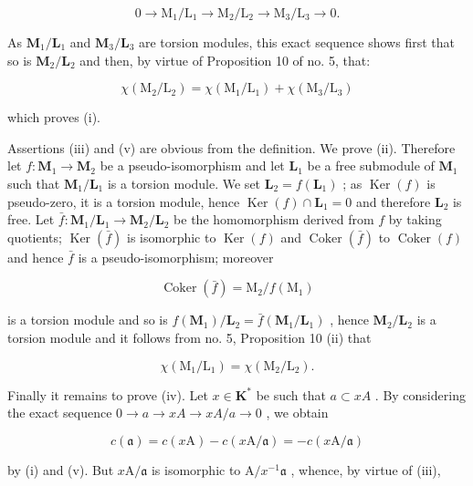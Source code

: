 \[
0 \rightarrow \mathrm{M} _ {1} / \mathrm{L} _ {1} \rightarrow \mathrm{M} _ {2} / \mathrm{L} _ {2} \rightarrow \mathrm{M} _ {3} / \mathrm{L} _ {3} \rightarrow 0.
\]

As \(\mathbf{M}_1 / \mathbf{L}_1\) and \(\mathbf{M}_3 / \mathbf{L}_3\) are torsion modules, this exact sequence shows first that so is \(\mathbf{M}_2 / \mathbf{L}_2\) and then, by virtue of Proposition 10 of no. 5, that:

\[
\chi (\mathrm{M} _ {2} / \mathrm{L} _ {2}) = \chi (\mathrm{M} _ {1} / \mathrm{L} _ {1}) + \chi (\mathrm{M} _ {3} / \mathrm{L} _ {3})
\]

which proves (i).

Assertions (iii) and (v) are obvious from the definition. We prove (ii). Therefore let \(f \colon \mathbf{M}_1 \to \mathbf{M}_2\) be a pseudo-isomorphism and let \(\mathbf{L}_1\) be a free submodule of \(\mathbf{M}_1\) such that \(\mathbf{M}_1 / \mathbf{L}_1\) is a torsion module. We set \(\mathbf{L}_2 = f(\mathbf{L}_1)\) ; as \(\operatorname{Ker}(f)\) is pseudo-zero, it is a torsion module, hence \(\operatorname{Ker}(f) \cap \mathbf{L}_1 = 0\) and therefore \(\mathbf{L}_2\) is free. Let \(\bar{f} \colon \mathbf{M}_1 / \mathbf{L}_1 \to \mathbf{M}_2 / \mathbf{L}_2\) be the homomorphism derived from \(f\) by taking quotients; \(\operatorname{Ker}(\bar{f})\) is isomorphic to \(\operatorname{Ker}(f)\) and \(\operatorname{Coker}(\bar{f})\) to \(\operatorname{Coker}(f)\) and hence \(\bar{f}\) is a pseudo-isomorphism; moreover

\[
\operatorname{Coker} (\bar {f}) = \mathrm{M} _ {2} / f (\mathrm{M} _ {1})
\]

is a torsion module and so is \(f(\mathbf{M}_1) / \mathbf{L}_2 = \bar{f} (\mathbf{M}_1 / \mathbf{L}_1)\) , hence \(\mathbf{M}_2 / \mathbf{L}_2\) is a torsion module and it follows from no. 5, Proposition 10 (ii) that

\[
\chi (\mathrm{M} _ {1} / \mathrm{L} _ {1}) = \chi (\mathrm{M} _ {2} / \mathrm{L} _ {2}).
\]

Finally it remains to prove (iv). Let \(x \in \mathbf{K}^*\) be such that \(a \subset xA\) . By considering the exact sequence \(0 \to a \to xA \to xA / a \to 0\) , we obtain

\[
c (\mathfrak {a}) = c (x \mathrm{A}) - c (x \mathrm{A} / \mathfrak {a}) = - c (x \mathrm{A} / \mathfrak {a})
\]

by (i) and (v). But \(x\mathrm{A} / \mathfrak{a}\) is isomorphic to \(\mathrm{A} / x^{-1}\mathfrak{a}\) , whence, by virtue of (iii),

